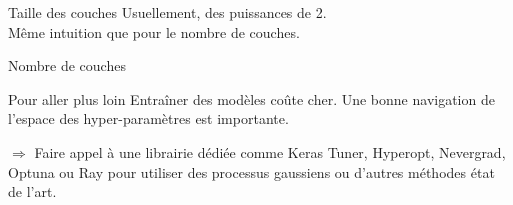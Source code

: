 \begin{frame}{Taille des couches}
  Usuellement, des puissances de 2. \\
  Même intuition que pour le nombre de couches.
\end{frame}

\begin{frame}{Nombre de couches}
\end{frame}

\begin{frame}{Pour aller plus loin}
  Entraîner des modèles coûte cher.
  Une bonne navigation de l'espace des hyper-paramètres est importante.

  $\Rightarrow$ Faire appel à une librairie dédiée comme Keras Tuner, Hyperopt, Nevergrad, Optuna ou Ray pour utiliser des processus gaussiens ou d'autres méthodes état de l'art.
\end{frame}
